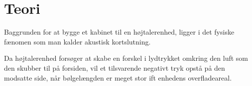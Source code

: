 \chapter{Teori}


Baggrunden for at bygge et kabinet til en højtalerenhed, ligger i det fysiske fænomen som man kalder akustisk kortslutning. 

Da højtalerenhed forsøger at skabe en forskel i lydtrykket omkring den luft som den skubber til på forsiden, vil et tilsvarende negativt tryk opstå på den modsatte side, når bølgelængden er meget stor ift enhedens overfladeareal.  



